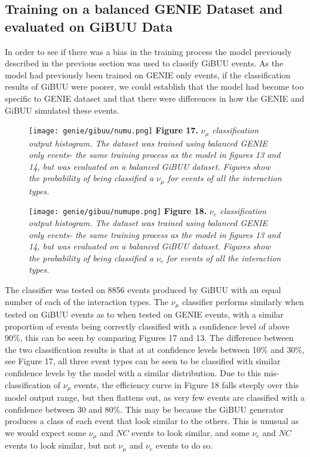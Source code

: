 \subsection{Training on a balanced GENIE Dataset and evaluated on GiBUU Data}

\noindent In order to see if there was a bias in the training process the model previously described in the previous section was used to classify GiBUU events. As the model had previously been trained on GENIE only events, if the classification results of GiBUU were poorer, we could establish that the model had become too specific to GENIE dataset and that there were differences in how the GENIE and GiBUU simulated these events. \medskip

\begin{figure}[t!]
 \centering
 \texttt{[image: genie/gibuu/numu.png]}
 \textbf{Figure 17.} \textit{$\nu_\mu$ classification output histogram. The dataset was trained using balanced GENIE only events- the same training process as the model in figures 13 and 14, but was evaluated on a balanced GiBUU dataset. Figures show the probability of being classified a $\nu_\mu$ for events of all the interaction types.}

 \texttt{[image: genie/gibuu/numupe.png]}
 \textbf{Figure 18.} \textit{$\nu_e$ classification output histogram. The dataset was trained using balanced GENIE only events- the same training process as the model in figures 13 and 14, but was evaluated on a balanced GiBUU dataset. Figures show the probability of being classified a $\nu_e$ for events of all the interaction types.}
\end{figure}

\noindent The classifier was tested on 8856 events produced by GiBUU with an equal number of each of the interaction types. The $\nu_\mu$ classifier performs similarly when tested on GiBUU events as to when tested on GENIE events, with a similar proportion of events being correctly classified with a confidence level of above 90\%, this can be seen by comparing Figures 17 and 13. The difference between the two classification results is that at at confidence levels between 10\% and 30\%, see Figure 17, all three event types can be seen to be classified with similar confidence levels by the model with a similar distribution. Due to this mis-classification of $\nu_\mu$ events, the efficiency curve in Figure 18 falls steeply over this model output range, but then flattens out, as very few events are classified with a confidence between 30 and 80\%. This may be because the GiBUU generator produces a class of each event that look similar to the others. This is unusual as we would expect some $\nu_\mu$ and $NC$ events to look similar, and some $\nu_e$ and $NC$ events to look similar, but not $\nu_\mu$ and $\nu_e$ events to do so. \medskip

